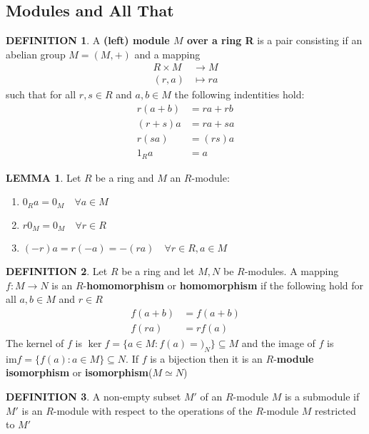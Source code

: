 \documentclass[12pt]{article}
\theoremstyle{definition}
\newtheorem{definition}{DEFINITION}[subsection]
\newcommand{\image}{\text{im}}
\newtheorem{lemma}{LEMMA}[subsection]
\begin{document}
\subsection{Modules and All That}
\begin{definition}
    A \textbf{(left) module $M$ over a ring R} is a pair consisting if an abelian group $M = (M, +)$ and a mapping
    \[\begin{split}
        R\times M &\rightarrow M\\
        (r,a) &\mapsto ra
    \end{split}\]
    such that for all $r,s \in R$ and $a,b \in M$ the following indentities hold:
    \[\begin{split}
        r(a+b) &= ra + rb\\
        (r+s)a &= ra + sa\\
        r(sa) &= (rs)a\\
        1_R a &= a
    \end{split}\]
\end{definition}

\begin{lemma}
    Let $R$ be a ring and $M$ an $R$-module:
    \begin{enumerate}
        \item $0_Ra = 0_M \quad \forall a \in M$
        \item $r0_M = 0_M \quad \forall r \in R$
        \item $(-r)a = r(-a) = -(ra) \quad \forall r\in R, a \in M$
    \end{enumerate}
\end{lemma}

\begin{definition}
    Let $R$ be a ring and let $M,N$ be $R$-modules. A mapping $f:M \rightarrow N$ is an $R$-\textbf{homomorphism} or \textbf{homomorphism} if the following hold for all $a,b \in M$ and $r \in R$
    \[\begin{split}
        f(a+b) &= f(a+b)\\
        f(ra) &= rf(a)
    \end{split}\]
    The kernel of $f$ is $\ker f  =\{a\in M:f(a)=)_N\} \subseteq M$ and the image of $f$ is $\image f = \{f(a):a\in M\}\subseteq N$. If $f$ is a bijection then it is an $R$-\textbf{module isomorphism} or \textbf{isomorphism}($M \simeq N$)
\end{definition}

\begin{definition}
    A non-empty subset $M'$ of an $R$-module $M$ is a submodule if $M'$ is an $R$-module with respect to the operations of the $R$-module $M$ restricted to $M'$
\end{definition}
\end{document}

